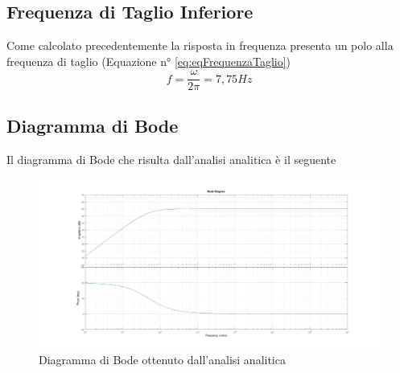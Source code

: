 \subsection{Frequenza di Taglio Inferiore}\label{subsec:frequenza_taglio_inferiore}
Come calcolato precedentemente la risposta in frequenza presenta un polo alla frequenza di taglio  (Equazione n° \ref{eq:eqFrequenzaTaglio})
$$f = \dfrac{\omega}{2\pi} = 7,75 Hz$$

\subsection{Diagramma di Bode}\label{subsec:diagramma_bode}
Il diagramma di Bode che risulta dall'analisi analitica è il seguente\\
\begin{figure}[h]
    \centering
    \includegraphics[width=1\textwidth]{Figure/BodeAnalitico.jpg}
    \caption{Diagramma di Bode ottenuto dall'analisi analitica}
    \label{fig:bodeAnalitico}
\end{figure}
\newpage
